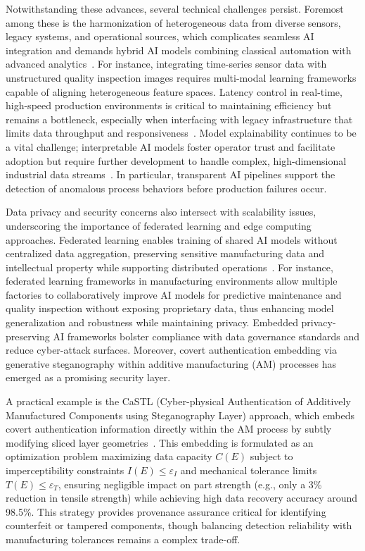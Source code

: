 \documentclass[sigconf]{acmart}
\begin{document}
Notwithstanding these advances, several technical challenges persist. Foremost among these is the harmonization of heterogeneous data from diverse sensors, legacy systems, and operational sources, which complicates seamless AI integration and demands hybrid AI models combining classical automation with advanced analytics~\cite{ref10,ref20,ref36}. For instance, integrating time-series sensor data with unstructured quality inspection images requires multi-modal learning frameworks capable of aligning heterogeneous feature spaces. Latency control in real-time, high-speed production environments is critical to maintaining efficiency but remains a bottleneck, especially when interfacing with legacy infrastructure that limits data throughput and responsiveness~\cite{ref10,ref42}. Model explainability continues to be a vital challenge; interpretable AI models foster operator trust and facilitate adoption but require further development to handle complex, high-dimensional industrial data streams~\cite{ref10,ref42}. In particular, transparent AI pipelines support the detection of anomalous process behaviors before production failures occur.

Data privacy and security concerns also intersect with scalability issues, underscoring the importance of federated learning and edge computing approaches. Federated learning enables training of shared AI models without centralized data aggregation, preserving sensitive manufacturing data and intellectual property while supporting distributed operations~\cite{ref29,ref36}. For instance, federated learning frameworks in manufacturing environments allow multiple factories to collaboratively improve AI models for predictive maintenance and quality inspection without exposing proprietary data, thus enhancing model generalization and robustness while maintaining privacy. Embedded privacy-preserving AI frameworks bolster compliance with data governance standards and reduce cyber-attack surfaces. Moreover, covert authentication embedding via generative steganography within additive manufacturing (AM) processes has emerged as a promising security layer. 

A practical example is the CaSTL (Cyber-physical Authentication of Additively Manufactured Components using Steganography Layer) approach, which embeds covert authentication information directly within the AM process by subtly modifying sliced layer geometries~\cite{ref10}. This embedding is formulated as an optimization problem maximizing data capacity $C(E)$ subject to imperceptibility constraints $I(E) \leq \varepsilon_I$ and mechanical tolerance limits $T(E) \leq \varepsilon_T$, ensuring negligible impact on part strength (e.g., only a 3\% reduction in tensile strength) while achieving high data recovery accuracy around 98.5\%. This strategy provides provenance assurance critical for identifying counterfeit or tampered components, though balancing detection reliability with manufacturing tolerances remains a complex trade-off.
\end{document}
